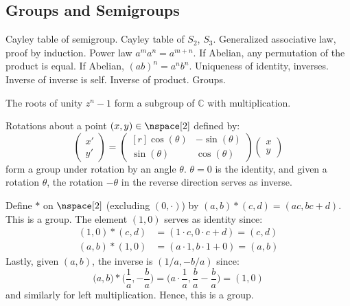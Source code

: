 \documentclass{article}                                                        %
\begin{document}
        \subsection{Groups and Semigroups}
            Cayley table of semigroup. Cayley table of $S_{2}$, $S_{3}$.
            Generalized associative law, proof by induction. Power law
            $a^{m}a^{n}=a^{m+n}$. If Abelian, any permutation of the product is
            equal. If Abelian, $(ab)^{n}=a^{n}b^{n}$. Uniqueness of identity,
            inverses. Inverse of inverse is self. Inverse of product. Groups.
            \begin{example}
                The roots of unity $z^{n}-1$ form a subgroup of $\mathbb{C}$
                with multiplication.
            \end{example}
            \begin{example}
                Rotations about a point $(x,y)\in\nspace[2]$ defined by:
                \begin{equation}
                    \begin{pmatrix}
                        x'\\
                        y'
                    \end{pmatrix}=
                    \begin{pmatrix*}[r]
                        \cos(\theta)&\minus\sin(\theta)\\
                        \sin(\theta)&\cos(\theta)
                    \end{pmatrix*}
                    \begin{pmatrix}
                        x\\
                        y
                    \end{pmatrix}
                \end{equation}
                form a group under rotation by an angle $\theta$. $\theta=0$ is
                the identity, and given a rotation $\theta$, the rotation
                $\minus\theta$ in the reverse direction serves as inverse.
            \end{example}
            \begin{example}
                Define $*$ on $\nspace[2]$ (excluding $(0,\cdot)$) by
                $(a,b)*(c,d)=(ac,bc+d)$. This is a group. The element $(1,0)$
                serves as identity since:
                \begin{align}
                    (1,0)*(c,d)&=(1\cdot{c},0\cdot{c}+d)=(c,d)\\
                    (a,b)*(1,0)&=(a\cdot{1},b\cdot{1}+0)=(a,b)
                \end{align}
                Lastly, given $(a,b)$, the inverse is $(1/a,\minus{b}/a)$ since:
                \begin{equation}
                    \big(a,b\big)*\big(\frac{1}{a},\minus\frac{b}{a}\big)
                        =\big(a\cdot\frac{1}{a},\frac{b}{a}-\frac{b}{a}\big)
                        =(1,0)
                \end{equation}
                and similarly for left multiplication. Hence, this is a group.
            \end{example}
\end{document}
